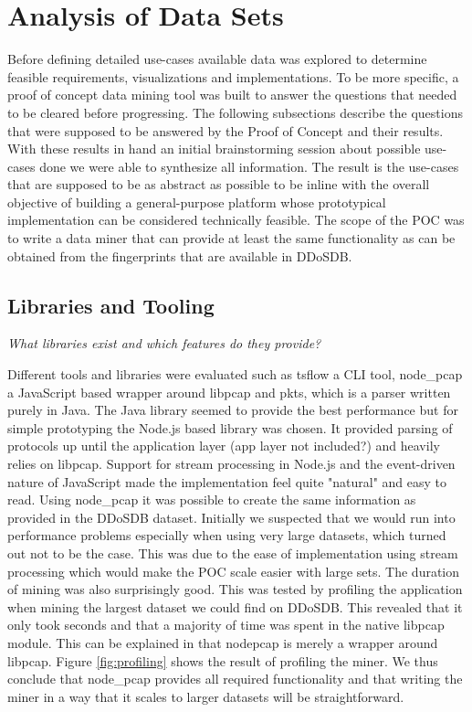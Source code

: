 \section{Analysis of Data Sets}
Before defining detailed use-cases available data was explored to determine feasible requirements, visualizations and implementations. To be more specific, a proof of concept data mining tool was built to answer the questions that needed to be cleared before progressing. The following subsections describe the questions that were supposed to be answered by the Proof of Concept and their results. With these results in hand an initial brainstorming session about possible use-cases done we were able to synthesize all information. The result is the use-cases that are supposed to be as abstract as possible to be inline with the overall objective of building a general-purpose platform whose prototypical implementation can be considered technically feasible.
The scope of the POC was to write a data miner that can provide at least the same functionality as can be obtained from the fingerprints that are available in DDoSDB.


\subsection{Libraries and Tooling}\label{librariesandtooling}

\textit{What libraries exist and which features do they provide?}   

   Different tools and libraries were evaluated such as tsflow a CLI tool, node\_pcap a JavaScript based wrapper around libpcap and pkts, which is a parser written purely in Java.
    The Java library seemed to provide the best performance but for simple prototyping the Node.js based library was chosen. It provided parsing of protocols up until the application layer (app layer not included?) and heavily relies on libpcap. Support for stream processing in Node.js and the event-driven nature of JavaScript made the implementation feel quite "natural" and easy to read.
    Using node\_pcap it was possible to create the same information as provided in the DDoSDB dataset. Initially we suspected that we would run into performance problems especially when using very large datasets, which turned out not to be the case. This was due to the ease of implementation using stream processing which would make the POC scale easier with large sets. The duration of mining was also surprisingly good. This was tested by profiling the application when mining the largest dataset we could find on DDoSDB. This revealed that it only took seconds and that a majority of time was spent in the native libpcap module. This can be explained in that node\-pcap is merely a wrapper around libpcap. Figure \ref{fig:profiling} shows the result of profiling the miner. We thus conclude that node\_pcap provides all required functionality and that writing the miner in a way that it scales to larger datasets will be straightforward.
    
